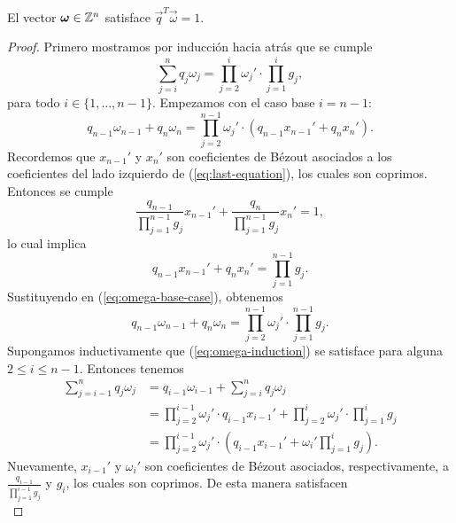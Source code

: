 \begin{lemma} \label{lemma:iso1} El vector $\boldsymbol{\omega} \in \mathbb{Z}^n$ satisface $\vec{q}^T\vec{\omega}
	= 1$.
\end{lemma}
\begin{proof}
	Primero mostramos por inducción hacia atrás que se cumple
	\begin{equation}
		\label{eq:omega-induction} \sum_{j=i}^{n}q_j\omega_j =
		\prod_{j=2}^{i}\omega_j' \cdot \prod_{j=1}^{i}g_j,
	\end{equation}
	para todo $i \in \lbrace 1, \ldots, n - 1\rbrace$. Empezamos con el caso base $i = n - 1$:
	\begin{equation}
		\label{eq:omega-base-case}
		q_{n-1}\omega_{n-1} + q_n\omega_n =
		\prod_{j=2}^{n-1}\omega_j' \cdot \left(q_{n-1}x_{n-1}' + q_nx_n'\right).
	\end{equation}
	Recordemos que $x_{n-1}'$ y $x_n'$ son coeficientes de Bézout asociados a los coeficientes del
	lado izquierdo de (\ref{eq:last-equation}), los cuales son coprimos. Entonces se cumple
	\begin{equation*}
		\frac{q_{n-1}}{\prod_{j=1}^{n-1}g_j}x_{n-1}' +
		\frac{q_n}{\prod_{j=1}^{n-1}g_j}x_n' = 1,
	\end{equation*}
	lo cual implica 
	\begin{equation*}
		q_{n-1}x_{n-1}' + q_nx_n' = \prod_{j=1}^{n-1}g_j.
	\end{equation*}
	Sustituyendo en (\ref{eq:omega-base-case}), obtenemos
	\begin{equation*}
		q_{n-1}\omega_{n-1} + q_n\omega_n  =
		\prod_{j=2}^{n-1}\omega_j' \cdot \prod_{j=1}^{n-1}g_j.
	\end{equation*}
	Supongamos inductivamente que (\ref{eq:omega-induction}) se satisface para alguna $2 \leq i \leq
	n - 1$. Entonces tenemos
	\begin{align*}
		\sum_{j=i-1}^{n}q_j\omega_j
		&= q_{i-1}\omega_{i-1} + \sum_{j=i}^{n}q_j\omega_j \\
		&= \prod_{j=2}^{i-1}\omega_j' \cdot q_{i-1}x_{i-1}' + \prod_{j=2}^{i}\omega_j' \cdot
		\prod_{j=1}^{i}g_j \\
		&= \prod_{j=2}^{i-1}\omega_j' \cdot \left( q_{i-1}x_{i-1}' + \omega_i'
			\prod_{j=1}^{i}g_j \right).
	\end{align*}
	Nuevamente, $x_{i-1}'$ y $\omega_i'$ son coeficientes de Bézout asociados, respectivamente, a
	$\frac{q_{i-1}}{\prod_{j=1}^{i-1}g_j}$ y $g_i$, los cuales son coprimos. De esta manera
	satisfacen
	\begin{equation*}

\end{equation*}
\end{proof}
